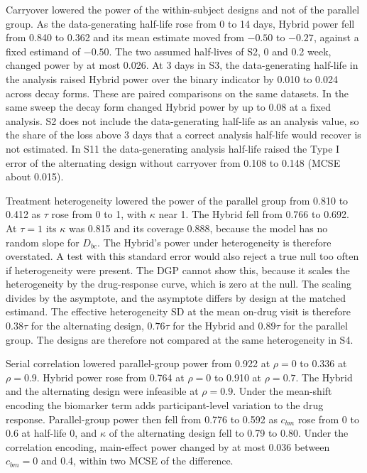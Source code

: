\documentclass[
  11pt,
]{article}
\begin{document}
Carryover lowered the power of the within-subject designs and not of the parallel group. As the data-generating half-life rose from 0 to 14 days, Hybrid power fell from 0.840 to 0.362 and its mean estimate moved from \(-0.50\) to \(-0.27\), against a fixed estimand of \(-0.50\). The two assumed half-lives of S2, 0 and 0.2 week, changed power by at most 0.026. At 3 days in S3, the data-generating half-life in the analysis raised Hybrid power over the binary indicator by 0.010 to 0.024 across decay forms. These are paired comparisons on the same datasets. In the same sweep the decay form changed Hybrid power by up to 0.08 at a fixed analysis. S2 does not include the data-generating half-life as an analysis value, so the share of the loss above 3 days that a correct analysis half-life would recover is not estimated. In S11 the data-generating analysis half-life raised the Type I error of the alternating design without carryover from 0.108 to 0.148 (MCSE about 0.015).

Treatment heterogeneity lowered the power of the parallel group from 0.810 to 0.412 as \(\tau\) rose from 0 to 1, with \(\kappa\) near 1. The Hybrid fell from 0.766 to 0.692. At \(\tau = 1\) its \(\kappa\) was 0.815 and its coverage 0.888, because the model has no random slope for \(D_{bc}\). The Hybrid's power under heterogeneity is therefore overstated. A test with this standard error would also reject a true null too often if heterogeneity were present. The DGP cannot show this, because it scales the heterogeneity by the drug-response curve, which is zero at the null. The scaling divides by the asymptote, and the asymptote differs by design at the matched estimand. The effective heterogeneity SD at the mean on-drug visit is therefore \(0.38\tau\) for the alternating design, \(0.76\tau\) for the Hybrid and \(0.89\tau\) for the parallel group. The designs are therefore not compared at the same heterogeneity in S4.

Serial correlation lowered parallel-group power from 0.922 at \(\rho = 0\) to 0.336 at \(\rho = 0.9\). Hybrid power rose from 0.764 at \(\rho = 0\) to 0.910 at \(\rho = 0.7\). The Hybrid and the alternating design were infeasible at \(\rho = 0.9\). Under the mean-shift encoding the biomarker term adds participant-level variation to the drug response. Parallel-group power then fell from 0.776 to 0.592 as \(c_{bm}\) rose from 0 to 0.6 at half-life 0, and \(\kappa\) of the alternating design fell to 0.79 to 0.80. Under the correlation encoding, main-effect power changed by at most 0.036 between \(c_{bm} = 0\) and 0.4, within two MCSE of the difference.
\end{document}
